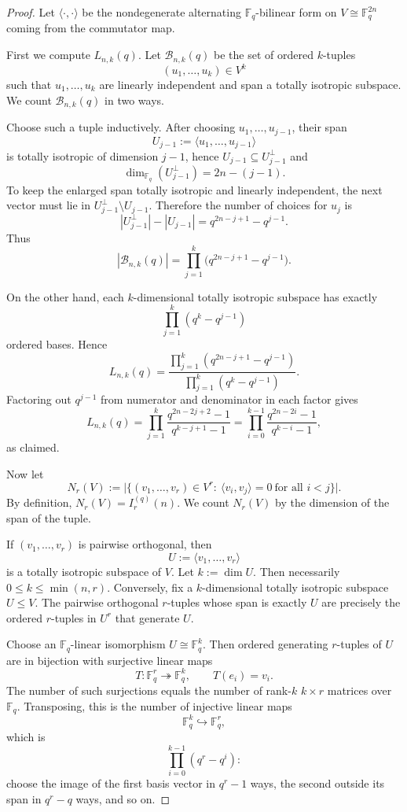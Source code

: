 \documentclass[10pt,a4paper]{amsart}
\begin{document}
\begin{proof}
Let $\langle\cdot,\cdot\rangle$ be the nondegenerate alternating $\mathbb F_q$-bilinear form on
$V\cong \mathbb F_q^{2n}$ coming from the commutator map.

First we compute $L_{n,k}(q)$.
Let $\mathcal B_{n,k}(q)$ be the set of ordered $k$-tuples
\[
(u_1,\dots,u_k)\in V^k
\]
such that $u_1,\dots,u_k$ are linearly independent and span a totally isotropic subspace.
We count $\mathcal B_{n,k}(q)$ in two ways.

Choose such a tuple inductively.
After choosing $u_1,\dots,u_{j-1}$, their span
\[
U_{j-1}:=\langle u_1,\dots,u_{j-1}\rangle
\]
is totally isotropic of dimension $j-1$, hence $U_{j-1}\subseteq U_{j-1}^{\perp}$ and
\[
\dim_{\mathbb F_q}(U_{j-1}^{\perp})=2n-(j-1).
\]
To keep the enlarged span totally isotropic and linearly independent, the next vector must lie in
$U_{j-1}^{\perp}\setminus U_{j-1}$. Therefore the number of choices for $u_j$ is
\[
|U_{j-1}^{\perp}|-|U_{j-1}|=q^{2n-j+1}-q^{j-1}.
\]
Thus
\[
|\mathcal B_{n,k}(q)|
=
\prod_{j=1}^{k}\bigl(q^{2n-j+1}-q^{j-1}\bigr).
\]

On the other hand, each $k$-dimensional totally isotropic subspace has exactly
\[
\prod_{j=1}^{k}(q^k-q^{j-1})
\]
ordered bases. Hence
\[
L_{n,k}(q)
=
\frac{\prod_{j=1}^{k}(q^{2n-j+1}-q^{j-1})}
     {\prod_{j=1}^{k}(q^k-q^{j-1})}.
\]
Factoring out $q^{j-1}$ from numerator and denominator in each factor gives
\[
L_{n,k}(q)
=
\prod_{j=1}^{k}\frac{q^{2n-2j+2}-1}{q^{k-j+1}-1}
=
\prod_{i=0}^{k-1}\frac{q^{2n-2i}-1}{q^{k-i}-1},
\]
as claimed.

Now let
\[
N_r(V):=\bigl|\{(v_1,\dots,v_r)\in V^r:\ \langle v_i,v_j\rangle=0\ \text{for all }i<j\}\bigr|.
\]
By definition, $N_r(V)=I_r^{(q)}(n)$.
We count $N_r(V)$ by the dimension of the span of the tuple.

If $(v_1,\dots,v_r)$ is pairwise orthogonal, then
\[
U:=\langle v_1,\dots,v_r\rangle
\]
is a totally isotropic subspace of $V$.
Let $k:=\dim U$. Then necessarily $0\le k\le \min(n,r)$.
Conversely, fix a $k$-dimensional totally isotropic subspace $U\le V$.
The pairwise orthogonal $r$-tuples whose span is exactly $U$ are precisely the ordered $r$-tuples in $U^r$
that generate $U$.

Choose an $\mathbb F_q$-linear isomorphism $U\cong \mathbb F_q^k$.
Then ordered generating $r$-tuples of $U$ are in bijection with surjective linear maps
\[
T:\mathbb F_q^r\twoheadrightarrow \mathbb F_q^k,
\qquad
T(e_i)=v_i.
\]
The number of such surjections equals the number of rank-$k$ $k\times r$ matrices over $\mathbb F_q$.
Transposing, this is the number of injective linear maps
\[
\mathbb F_q^k\hookrightarrow \mathbb F_q^r,
\]
which is
\[
\prod_{i=0}^{k-1}(q^r-q^i):
\]
choose the image of the first basis vector in $q^r-1$ ways, the second outside its span in $q^r-q$ ways,
and so on.


\end{proof}
\end{document}
